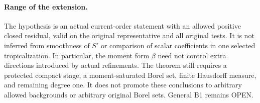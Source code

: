 \paragraph{Range of the extension.}
The hypothesis is an actual current-order statement with an allowed
positive closed residual, valid on the original representative and all
original tests. It is not inferred from smoothness of $S'$ or comparison
of scalar coefficients in one selected tropicalization. In particular,
the moment form $\beta$ need not control extra directions introduced by
actual refinements. The theorem still requires a protected compact
stage, a moment-saturated Borel set, finite Hausdorff measure, and
remaining degree one. It does not promote these conclusions to arbitrary
allowed backgrounds or arbitrary original Borel sets. General B1
remains OPEN.

